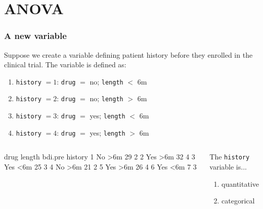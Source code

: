 \section[ANOVA]{ANOVA}
\begin{frame}
\end{frame}


\begin{frame}[fragile]
\frametitle{A new variable}
Suppose we create a variable defining patient history before they enrolled in the clinical trial.  The variable is defined as:
\begin{enumerate}
    \item
    \texttt{history} $= 1$: \texttt{drug} $=$ no; \texttt{length} $<$ 6m
    \item
    \texttt{history} $= 2$: \texttt{drug} $=$ no; \texttt{length} $>$ 6m
    \item
    \texttt{history} $= 3$: \texttt{drug} $=$ yes; \texttt{length} $<$ 6m
    \item
    \texttt{history} $= 4$: \texttt{drug} $=$ yes; \texttt{length} $>$ 6m
\end{enumerate}
\begin{columns}
\begin{lcverbatim}
  drug length bdi.pre history
1   No    >6m      29       2
2  Yes    >6m      32       4
3  Yes    <6m      25       3
4   No    >6m      21       2
5  Yes    >6m      26       4
6  Yes    <6m       7       3
\end{lcverbatim}
\begin{clicker}{The \texttt{history} variable is...}
\begin{enumerate}
    \item
    quantitative
    \item
    categorical
\end{enumerate}
\end{clicker}
\end{columns}
\end{frame}



